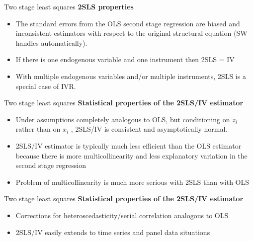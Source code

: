 \documentclass[usenames,dvipsnames]{beamer}
\begin{document}
\begin{frame}{Two stage least squares}
\textbf{2SLS properties}
\vspace{0.3cm}
\begin{itemize}
\item The standard errors from the OLS second stage regression are biased and inconsistent estimators with respect to the original structural equation (SW handles automatically).
\vspace{0.3cm}
\item If there is one endogenous variable and one instrument then 2SLS = IV
\vspace{0.3cm}
\item With multiple endogenous variables and/or multiple instruments, 2SLS is a special case of IVR.
\vspace{0.3cm}
\end{itemize}
\end{frame}
\begin{frame}{Two stage least squares}
\textbf{Statistical properties of the 2SLS/IV estimator}
\vspace{0.3cm}
\begin{itemize}
\item Under assumptions completely analogous to OLS, but conditioning on $z_i$ rather than on $x_i$ , 2SLS/IV is consistent and asymptotically normal.
\vspace{0.3cm}
\item 2SLS/IV estimator is typically much less efficient than the OLS estimator because there is more multicollinearity and less explanatory variation in the second stage regression
\vspace{0.3cm}
\item Problem of multicollinearity is much more serious with 2SLS than with OLS
\end{itemize}
\end{frame}
\begin{frame}{Two stage least squares}
\textbf{Statistical properties of the 2SLS/IV estimator}
\vspace{0.5cm}
\begin{itemize}
\item Corrections for heteroscedasticity/serial correlation analogous to OLS
\vspace{0.3cm}
\item 2SLS/IV easily extends to time series and panel data situations
\end{itemize}
\end{frame}
\end{document}
